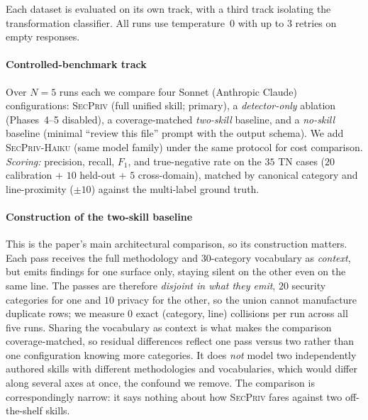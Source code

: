 \documentclass[runningheads]{llncs}
\begin{document}
Each dataset is evaluated on its own track, with a third track isolating the transformation classifier. All runs use temperature~$0$ with up to $3$ retries on empty responses.

\paragraph{Controlled-benchmark track} Over $N{=}5$ runs each we compare four Sonnet (Anthropic Claude) configurations: \textsc{SecPriv} (full unified skill; primary), a \emph{detector-only} ablation (Phases~4--5 disabled), a coverage-matched \emph{two-skill} baseline, and a \emph{no-skill} baseline (minimal ``review this file'' prompt with the output schema). We add \textsc{SecPriv-Haiku} (same model family) under the same protocol for cost comparison. \emph{Scoring:} precision, recall, $F_1$, and true-negative rate on the $35$ TN cases ($20$ calibration $+$ $10$ held-out $+$ $5$ cross-domain), matched by canonical category and line-proximity ($\pm 10$) against the multi-label ground truth.

\paragraph{Construction of the two-skill baseline} This is the paper's main architectural comparison, so its construction matters. Each pass receives the full methodology and $30$-category vocabulary as \emph{context}, but emits findings for one surface only, staying silent on the other even on the same line. The passes are therefore \emph{disjoint in what they emit}, $20$ security categories for one and $10$ privacy for the other, so the union cannot manufacture duplicate rows; we measure $0$ exact (category, line) collisions per run across all five runs. Sharing the vocabulary as context is what makes the comparison coverage-matched, so residual differences reflect one pass versus two rather than one configuration knowing more categories. It does \emph{not} model two independently authored skills with different methodologies and vocabularies, which would differ along several axes at once, the confound we remove. The comparison is correspondingly narrow: it says nothing about how \textsc{SecPriv} fares against two off-the-shelf skills.
\end{document}
